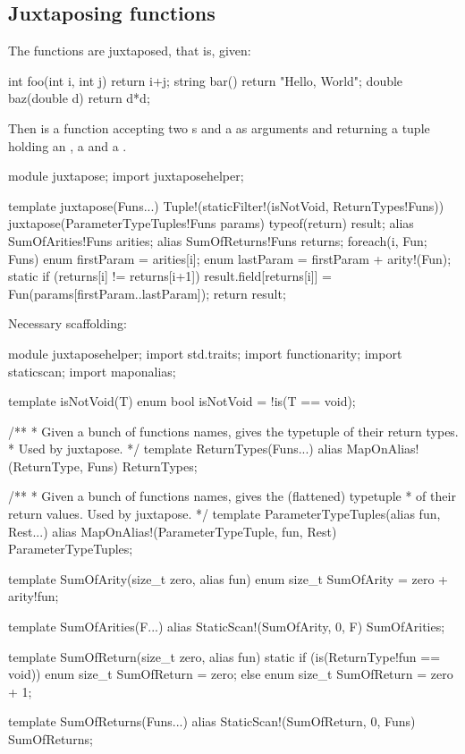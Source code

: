 \subsection{Juxtaposing functions}\label{juxtapose}


The functions are juxtaposed, that is, given:

\begin{dcode}
int foo(int i, int j) { return i+j;}
string bar() { return "Hello, World";}
double baz(double d) { return d*d;}
\end{dcode}

Then  is a function accepting two s and a  as arguments and returning a tuple holding an , a  and a .

\begin{dcode}
module juxtapose;
import juxtaposehelper;

template juxtapose(Funs...)
{
    Tuple!(staticFilter!(isNotVoid, ReturnTypes!Funs))
    juxtapose(ParameterTypeTuples!Funs params) 
    {
        typeof(return) result;
        alias SumOfArities!Funs arities;
        alias SumOfReturns!Funs returns;
        foreach(i, Fun; Funs) 
        {
            enum firstParam = arities[i];
            enum lastParam = firstParam + arity!(Fun);
            static if (returns[i] != returns[i+1])
                result.field[returns[i]] = Fun(params[firstParam..lastParam]);
        }
        return result;
    }
}
\end{dcode}

Necessary scaffolding:

\begin{dcode}
module juxtaposehelper;
import std.traits;
import functionarity;
import staticscan;
import maponalias;

template isNotVoid(T)
{
    enum bool isNotVoid = !is(T == void);
}

/** 
 * Given a bunch of functions names, gives the typetuple of their return types.
 * Used by juxtapose.
 */
template ReturnTypes(Funs...)
{
    alias MapOnAlias!(ReturnType, Funs) ReturnTypes;
}

/**
 * Given a bunch of functions names, gives the (flattened) typetuple
 * of their return values. Used by juxtapose.
 */
template ParameterTypeTuples(alias fun, Rest...)
{
    alias MapOnAlias!(ParameterTypeTuple, fun, Rest) ParameterTypeTuples;
}

template SumOfArity(size_t zero, alias fun)
{
    enum size_t SumOfArity = zero + arity!fun;
}

template SumOfArities(F...)
{
    alias StaticScan!(SumOfArity, 0, F) SumOfArities;
}

template SumOfReturn(size_t zero, alias fun)
{
    static if (is(ReturnType!fun == void))
        enum size_t SumOfReturn = zero;
    else
        enum size_t SumOfReturn = zero + 1;
}

template SumOfReturns(Funs...)
{
    alias StaticScan!(SumOfReturn, 0, Funs) SumOfReturns;
}
\end{dcode}

